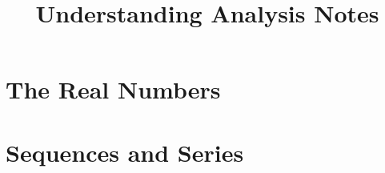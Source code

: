\documentclass[a4paper]{book}
\title{Understanding Analysis Notes}
\begin{document}
\maketitle
\tableofcontents

\chapter{The Real Numbers}







\chapter{Sequences and Series}
















% 

% 

% 

% 


% 

% 

% 

% 

% 
\end{document}
